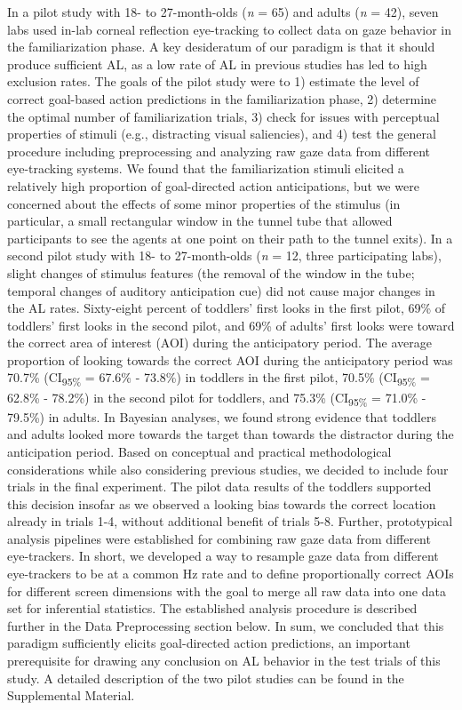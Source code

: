 \documentclass[
  man,floatsintext]{apa6}
\begin{document}
In a pilot study with 18- to 27-month-olds (\emph{n} = 65) and adults (\emph{n} = 42), seven labs used in-lab corneal reflection eye-tracking to collect data on gaze behavior in the familiarization phase. A key desideratum of our paradigm is that it should produce sufficient AL, as a low rate of AL in previous studies has led to high exclusion rates. The goals of the pilot study were to 1) estimate the level of correct goal-based action predictions in the familiarization phase, 2) determine the optimal number of familiarization trials, 3) check for issues with perceptual properties of stimuli (e.g., distracting visual saliencies), and 4) test the general procedure including preprocessing and analyzing raw gaze data from different eye-tracking systems. We found that the familiarization stimuli elicited a relatively high proportion of goal-directed action anticipations, but we were concerned about the effects of some minor properties of the stimulus (in particular, a small rectangular window in the tunnel tube that allowed participants to see the agents at one point on their path to the tunnel exits).
In a second pilot study with 18- to 27-month-olds (\emph{n} = 12, three participating labs), slight changes of stimulus features (the removal of the window in the tube; temporal changes of auditory anticipation cue) did not cause major changes in the AL rates.
Sixty-eight percent of toddlers' first looks in the first pilot, 69\% of toddlers' first looks in the second pilot, and 69\% of adults' first looks were toward the correct area of interest (AOI) during the anticipatory period. The average proportion of looking towards the correct AOI during the anticipatory period was 70.7\% (CI\textsubscript{95\%} = 67.6\% - 73.8\%) in toddlers in the first pilot, 70.5\% (CI\textsubscript{95\%} = 62.8\% - 78.2\%) in the second pilot for toddlers, and 75.3\% (CI\textsubscript{95\%} = 71.0\% - 79.5\%) in adults. In Bayesian analyses, we found strong evidence that toddlers and adults looked more towards the target than towards the distractor during the anticipation period. Based on conceptual and practical methodological considerations while also considering previous studies, we decided to include four trials in the final experiment. The pilot data results of the toddlers supported this decision insofar as we observed a looking bias towards the correct location already in trials 1-4, without additional benefit of trials 5-8.
Further, prototypical analysis pipelines were established for combining raw gaze data from different eye-trackers. In short, we developed a way to resample gaze data from different eye-trackers to be at a common Hz rate and to define proportionally correct AOIs for different screen dimensions with the goal to merge all raw data into one data set for inferential statistics. The established analysis procedure is described further in the Data Preprocessing section below.
In sum, we concluded that this paradigm sufficiently elicits goal-directed action predictions, an important prerequisite for drawing any conclusion on AL behavior in the test trials of this study. A detailed description of the two pilot studies can be found in the Supplemental Material.
\end{document}
